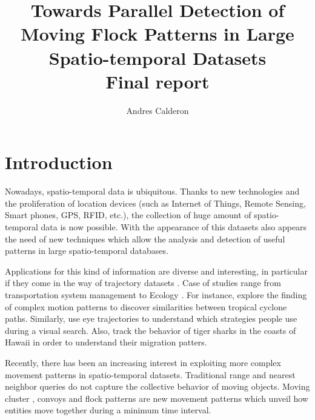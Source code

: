\documentclass[12pt]{scrartcl}
\title{Towards Parallel Detection of Moving Flock Patterns in Large Spatio-temporal Datasets\\ \normalsize{Final report}}
\author{Andres Calderon}
\begin{document}
\maketitle
 
\section{Introduction}
% 

Nowadays, spatio-temporal data is ubiquitous. Thanks to new technologies and the proliferation of location devices (such as Internet of Things, Remote Sensing, Smart phones, GPS, RFID, etc.), the collection of huge amount of spatio-temporal data is now possible. With the appearance of this datasets also appears the need of new techniques which allow the analysis and detection of useful patterns in large spatio-temporal databases.  

Applications for this kind of information are diverse and interesting, in particular if they come in the way of trajectory datasets \citep{jeung_trajectory_2011, huang_mining_2015}. Case of studies range from transportation system management \citep{di_lorenzo_allaboard:_2016,johansson_efficiency_2015} to Ecology \citep{johnston_abundance_2015, la_sorte_convergence_2016}.  For instance, \cite{turdukulov_visual_2014} explore the finding of complex motion patterns to discover similarities between tropical cyclone paths.  Similarly, \cite{amor_persistence_2016} use eye trajectories to understand which strategies people use during a visual search. Also, \cite{holland_movements_1999} track the behavior of tiger sharks in the coasts of Hawaii in order to understand their migration patters.

Recently, there has been an increasing interest in exploiting more complex movement patterns in spatio-temporal datasets.  Traditional range and nearest neighbor queries do not capture the collective behavior of moving objects.  Moving cluster \citep{kalnis_discovering_2005}, convoys \citep{jeung_discovery_2008} and flock patterns \citep{benkert_reporting_2008, gudmundsson_computing_2006} are new movement patterns which unveil how entities move together during a minimum time interval.  
\end{document}
